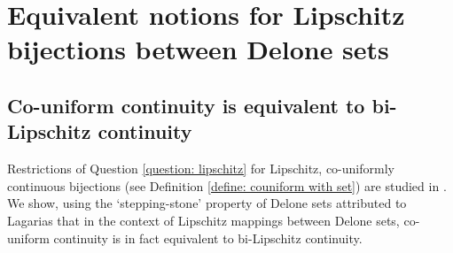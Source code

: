 \documentclass{article}
\begin{document}
\section{Equivalent notions for Lipschitz bijections between Delone sets} \label{chapter: viera}
\subsection{Co-uniform continuity is equivalent to bi-Lipschitz continuity}
Restrictions of Question \ref{question: lipschitz} for Lipschitz, co-uniformly continuous bijections (see Definition \ref{define: couniform with set}) are studied in \cite{viera2023delone}. We show, using the `stepping-stone' property of Delone sets attributed to Lagarias \cite[Lemma $2.2$]{lagarias1999geometric} that in the context of Lipschitz mappings between Delone sets, co-uniform continuity is in fact equivalent to bi-Lipschitz continuity.
\end{document}

